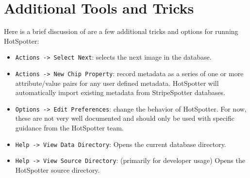 \documentclass[a4paper,10pt]{article}
\begin{document}
\newpage

\section{Additional Tools and Tricks}


Here is a brief discussion of are a few additional tricks and options
for running HotSpotter:
\begin{itemize}
\item \verb+Actions -> Select Next+:
    selects the next image in the database. 

\item \verb+Actions -> New Chip Property+:  
    record metadata as a series of one or more attribute/value pairs for any
    user defined metadata.  HotSpotter will automatically import existing
    metadata from StripeSpotter databases.



\item \verb+Options -> Edit Preferences+: 
    change the behavior of HotSpotter. For now, these are not very well
    documented and should only be used with specific guidance from 
    the HotSpotter team.




\item \verb+Help -> View Data Directory+: 
    Opens the current database directory.

\item \verb+Help -> View Source Directory+: (primarily for developer usage)
    Opens the HotSpotter source directory. 


\end{itemize}
\end{document}
